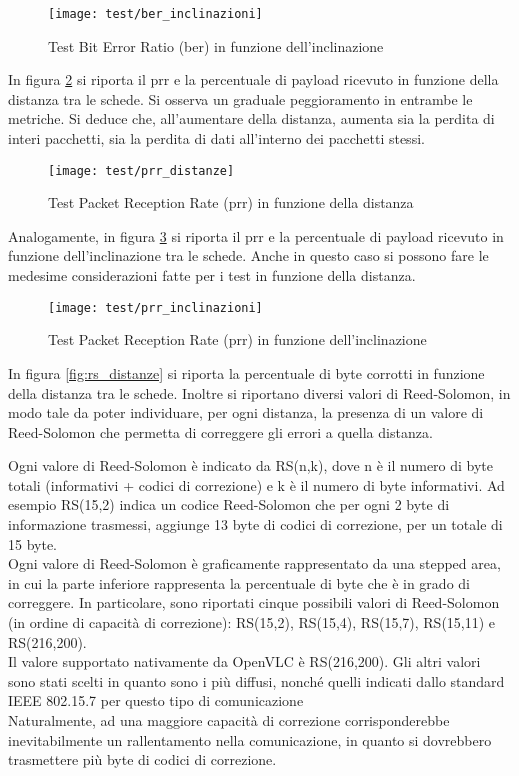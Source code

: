 \begin{figure}[H] 
    \centering 
    \texttt{[image: test/ber\_inclinazioni]} 
    \caption{Test Bit Error Ratio (\gls{ber}) in funzione dell'inclinazione}
    \label{fig:ber_inclinazioni}
\end{figure}

In figura \ref{fig:prr_distanze} si riporta il \gls{prr} e la percentuale di payload ricevuto in funzione della distanza tra le schede. Si osserva un graduale peggioramento in entrambe le metriche. Si deduce che, all'aumentare della distanza, aumenta sia la perdita di interi pacchetti, sia la perdita di dati all'interno dei pacchetti stessi. 

\begin{figure}[H] 
    \centering 
    \texttt{[image: test/prr\_distanze]} 
    \caption{Test Packet Reception Rate (\gls{prr}) in funzione della distanza}
    \label{fig:prr_distanze}
\end{figure}

Analogamente, in figura \ref{fig:prr_inclinazioni} si riporta il \gls{prr} e la percentuale di payload ricevuto in funzione dell'inclinazione tra le schede. Anche in questo caso si possono fare le medesime considerazioni fatte per i test in funzione della distanza.

\begin{figure}[H] 
    \centering 
    \texttt{[image: test/prr\_inclinazioni]} 
    \caption{Test Packet Reception Rate (\gls{prr}) in funzione dell'inclinazione}
    \label{fig:prr_inclinazioni}
\end{figure}

In figura \ref{fig:rs_distanze} si riporta la percentuale di byte corrotti in funzione della distanza tra le schede. Inoltre si riportano diversi valori di Reed-Solomon, in modo tale da poter individuare, per ogni distanza, la presenza di un valore di Reed-Solomon che permetta di correggere gli errori a quella distanza.

Ogni valore di Reed-Solomon è indicato da RS(n,k), dove n è il numero di byte totali (informativi + codici di correzione) e k è il numero di byte informativi. Ad esempio RS(15,2) indica un codice Reed-Solomon che per ogni 2 byte di informazione trasmessi, aggiunge 13 byte di codici di correzione, per un totale di 15 byte.\\
Ogni valore di Reed-Solomon è graficamente rappresentato da una stepped area, in cui la parte inferiore rappresenta la percentuale di byte che è in grado di correggere. In particolare, sono riportati cinque possibili valori di Reed-Solomon (in ordine di capacità di correzione): RS(15,2), RS(15,4), RS(15,7), RS(15,11) e RS(216,200).\\
Il valore supportato nativamente da OpenVLC è RS(216,200). Gli altri valori sono stati scelti in quanto sono i più diffusi, nonché quelli indicati dallo standard IEEE 802.15.7 per questo tipo di comunicazione\\
Naturalmente, ad una maggiore capacità di correzione corrisponderebbe inevitabilmente un rallentamento nella comunicazione, in quanto si dovrebbero trasmettere più byte di codici di correzione.

